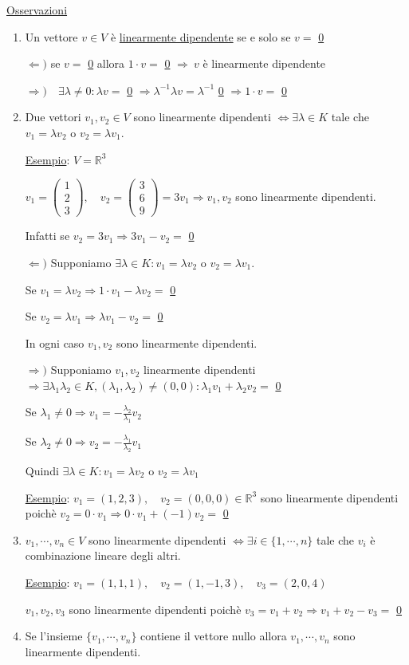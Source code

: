 \documentclass{article}
\newcommand{\ul}[1]{\underline{#1}}
\newcommand{\R}{\mathbb{R}}
\begin{document}
	\ul{Osservazioni}
	\begin{enumerate}
		\item Un vettore $v\in V$ è \ul{linearmente dipendente} se e solo se $v=$ \ul{0}

		      $\Leftarrow)$ se $v=$ \ul{0} allora $1\cdot v=$ \ul{0} $\Rightarrow\ v$ è linearmente dipendente

		      $\Rightarrow)\quad\exists\lambda\not=0:\lambda v=$ \ul{0} $\Rightarrow\lambda^{-1}\lambda v=\lambda^{-1}$ \ul{0} $\Rightarrow1\cdot v=$ \ul{0}
		\item Due vettori $v_1,v_2\in V$ sono linearmente dipendenti $\Leftrightarrow\exists\lambda\in K$ tale che $v_1=\lambda v_2$ o $v_2=\lambda v_1$.

		      \ul{Esempio}: $V=\R^3$

		      $v_1=\begin{pmatrix}1\\2\\3\end{pmatrix},\quad v_2=\begin{pmatrix}3\\6\\9\end{pmatrix}=3v_1\Rightarrow v_1,v_2$ sono linearmente dipendenti.

		      Infatti se $v_2=3v_1\Rightarrow3v_1-v_2=$ \ul{0}

		      $\Leftarrow)$ Supponiamo $\exists\lambda\in K:v_1=\lambda v_2$ o $v_2=\lambda v_1$.

		      Se $v_1=\lambda v_2\Rightarrow1\cdot v_1-\lambda v_2=$ \ul{0}

		      Se $v_2=\lambda v_1\Rightarrow\lambda v_1-v_2=$ \ul{0}

		      In ogni caso $v_1,v_2$ sono linearmente dipendenti.

		      $\Rightarrow)$ Supponiamo $v_1,v_2$ linearmente dipendenti $\Rightarrow\exists\lambda_1\lambda_2\in K,(\lambda_1,\lambda_2)\not=(0,0):\lambda_1v_1+\lambda_2v_2=$ \ul{0}

		      Se $\lambda_1\not=0\Rightarrow v_1=-\frac{\lambda_2}{\lambda_1}v_2$

		      Se $\lambda_2\not=0\Rightarrow v_2=-\frac{\lambda_1}{\lambda_2}v_1$

		      Quindi $\exists\lambda\in K:v_1=\lambda v_2$ o $v_2=\lambda v_1$

		      \ul{Esempio}: $v_1=(1,2,3),\quad v_2=(0,0,0)\in\R^3$ sono linearmente dipendenti poichè $v_2=0\cdot v_1\Rightarrow0\cdot v_1+(-1)v_2=$ \ul{0}
		\item $v_1,\cdots,v_n\in V$ sono linearmente dipendenti $\Leftrightarrow\exists i\in\{1,\cdots,n\}$ tale che $v_i$ è combinazione lineare degli altri.

		      \ul{Esempio}: $v_1=(1,1,1),\quad v_2=(1,-1,3),\quad v_3=(2,0,4)$

		      $v_1,v_2,v_3$ sono linearmente dipendenti poichè $v_3=v_1+v_2\Rightarrow v_1+v_2-v_3=$ \ul{0}
		\item Se l'insieme $\{v_1,\cdots,v_n\}$ contiene il vettore nullo allora $v_1,\cdots,v_n$ sono linearmente dipendenti.
	\end{enumerate}
\end{document}
